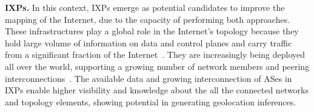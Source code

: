 
	\textbf{IXPs.} In this context, IXPs emerge as potential candidates to improve the mapping of the Internet, due to the capacity of performing both approaches. These infrastructures play a global role in the Internet’s topology because they hold large volume of information on data and control planes and carry traffic from a significant fraction of the Internet~\cite{Chatzis:2013:BUL:2504730.2504746}. They are increasingly being deployed all over the world, supporting a growing number of network members and peering interconnections~\cite{Giotsas:2017:DPI:3098822.3098855}. The available data and growing interconnection of ASes in IXPs enable higher visibility and knowledge about the all the connected networks and topology elements, showing potential in generating geolocation inferences.
	


